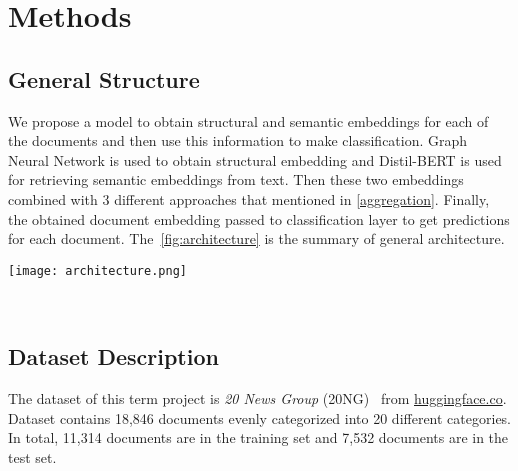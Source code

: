 \section{Methods}\label{sec:methods}
\subsection{General Structure}
We propose a model to obtain structural and semantic embeddings for each of the documents and then use this information to make classification. Graph Neural Network is used to obtain structural embedding and Distil-BERT is used for retrieving semantic embeddings from text. Then these two embeddings combined with 3 different approaches that mentioned in \cref{aggregation}. Finally, the obtained document embedding passed to classification layer to get predictions for each document. The~\cref{fig:architecture} is the summary of general architecture.
\begin{figure*}[ht]
    \centering{}
    \texttt{[image: architecture.png]}
    \caption{Model Architecture}~\label{fig:architecture}
\end{figure*}

\subsection{Dataset Description}
The dataset of this term project is \emph{20 News Group} (20NG)~\autocite{20newsgroup} from \href{https://huggingface.co/datasets/SetFit/20_newsgroups}{huggingface.co}. Dataset contains 18,846 documents evenly categorized into 20 different categories. In total, 11,314 documents are in the training set and 7,532 documents are in the test set.

